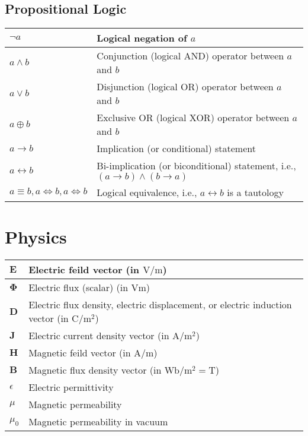 \documentclass{article}
\begin{document}
\subsection{Propositional Logic}
\begin{xltabular}{\textwidth}{XX}
    \(\lnot a\) & Logical negation of \(a\) \cite{rosenDiscreteMathematicsIts2011}\\ \hline
    \(a \wedge b\) & Conjunction (logical AND) operator between \(a\) and \(b\)\cite{rosenDiscreteMathematicsIts2011}\\ \hline
    \(a \vee b\) & Disjunction (logical OR) operator between \(a\) and \(b\)\cite{rosenDiscreteMathematicsIts2011}\\ \hline
    \(a \oplus b\) & Exclusive OR (logical XOR) operator between \(a\) and \(b\)\cite{rosenDiscreteMathematicsIts2011}\\ \hline
    \(a \rightarrow b\) & Implication (or conditional) statement\cite{rosenDiscreteMathematicsIts2011}\\ \hline
    \(a \leftrightarrow b\) & Bi-implication (or biconditional) statement, i.e., \(\left( a \rightarrow b \right) \wedge (b \rightarrow a )\) \cite{rosenDiscreteMathematicsIts2011}\\ \hline
    \(a \equiv b, a \iff b, a \Leftrightarrow b \) & Logical equivalence, i.e., \(a \leftrightarrow b\) is a tautology\cite{rosenDiscreteMathematicsIts2011}\\
\end{xltabular}

\section{Physics}
\begin{xltabular}{\textwidth}{XX}
    \(\mathbf{E}\) & Electric feild vector (in \(\si{\volt\per\meter}\))\\ \hline
    \(\mathbf{\Phi}\) & Electric flux (scalar) (in \(\si{\volt\meter}\))\\ \hline
    \(\mathbf{D}\) & Electric flux density, electric displacement, or electric induction vector (in \(\si{\coulomb\per\square\meter}\))\\ \hline
    \(\mathbf{J}\) & Electric current density vector (in \(\si{\ampere\per\square\meter}\))\\ \hline
    \(\mathbf{H}\) & Magnetic feild vector (in \(\si{\ampere\per\meter}\))\\ \hline
    \(\mathbf{B}\) & Magnetic flux density vector (in \(\si{\weber\per\meter\squared} = \si{\tesla}\))\\ \hline
    \(\epsilon\) & Electric permittivity \\ \hline
    \(\mu\) & Magnetic permeability \\ \hline
    \(\mu_0\) & Magnetic permeability in vacuum \\
\end{xltabular}
\end{document}
